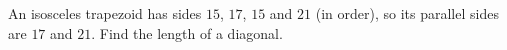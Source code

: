 An isosceles trapezoid has sides $15$, $17$, $15$ and $21$ (in order), so its parallel sides are $17$ and $21$. Find the length of a diagonal.
